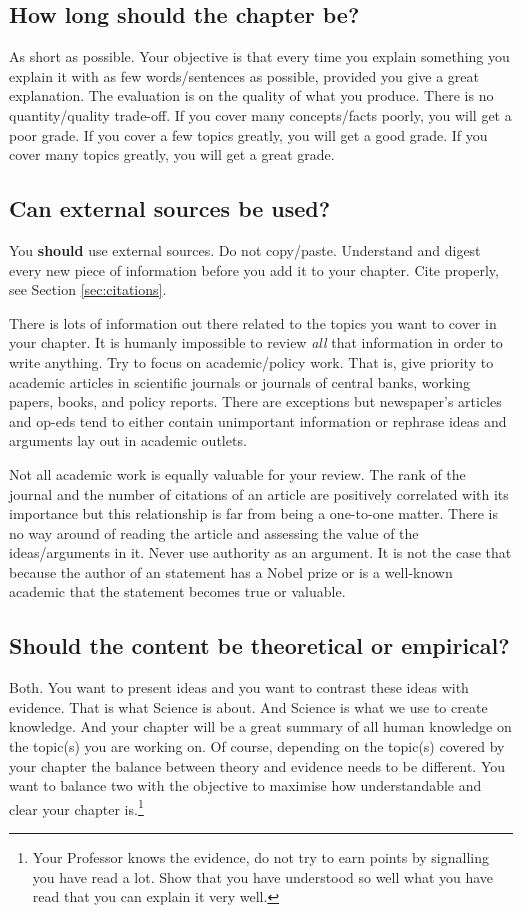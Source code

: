 \documentclass[11pt,a4paper,oneside]{book}
\begin{document}
\subsection*{How long should the chapter be?}
As short as possible. Your objective is that every time you explain something you explain it with as few words/sentences as possible, provided you give a great explanation. The evaluation is on the quality of what you produce. There is no quantity/quality trade-off. If you cover many concepts/facts poorly, you will get a poor grade. If you cover a few topics greatly, you will get a good grade. If you cover many topics greatly, you will get a great grade.

\subsection*{Can external sources be used?}
You \textbf{should} use external sources. Do not copy/paste. Understand and digest every new piece of information before you add it to your chapter. Cite properly, see Section \ref{sec:citations}.

There is lots of information out there related to the topics you want to cover in your chapter. It is humanly impossible to review \textit{all} that information in order to write anything. Try to focus on academic/policy work. That is, give priority to academic articles in scientific journals or journals of central banks, working papers, books, and policy reports. There are exceptions but newspaper's articles and op-eds tend to either contain unimportant information or rephrase ideas and arguments lay out in academic outlets.

Not all academic work is equally valuable for your review. The rank of the journal and the number of citations of an article are positively correlated with its importance but this relationship is far from being a one-to-one matter. There is no way around of reading the article and assessing the value of the ideas/arguments in it. Never use authority as an argument. It is not the case that because the author of an statement has a Nobel prize or is a well-known academic that the statement becomes true or valuable.

\subsection*{Should the content be theoretical or empirical?}
Both. You want to present ideas and you want to contrast these ideas with evidence. That is what Science is about. And Science is what we use to create knowledge. And your chapter will be a great summary of all human knowledge on the topic(s) you are working on. Of course, depending on the topic(s) covered by your chapter the balance between theory and evidence needs to be different. You want to balance two with the objective to maximise how understandable and clear your chapter is.\footnote{Your Professor knows the evidence, do not try to earn points by signalling you have read a lot. Show that you have understood so well what you have read that you can explain it very well.}
\end{document}
